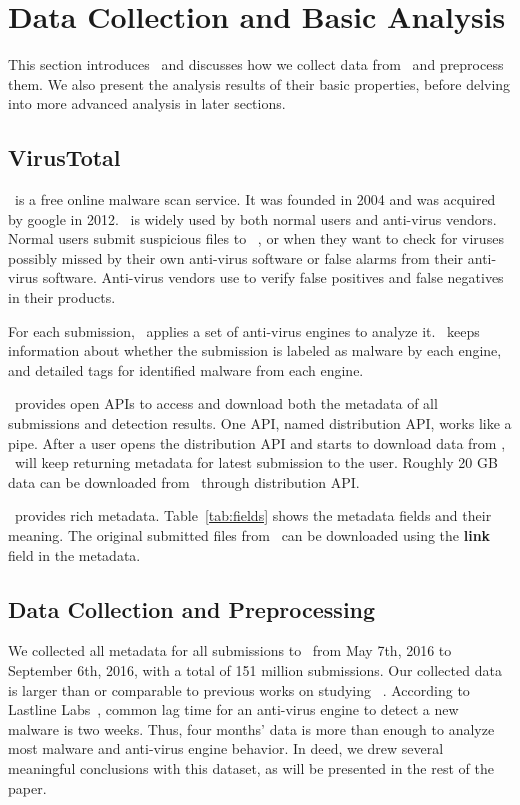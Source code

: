 \section{Data Collection and Basic Analysis}
\label{sec:meth}

This section introduces \vt\ and 
discusses how we collect data from \vt\ and preprocess them.
We also present the analysis results of their basic properties, 
before delving into more advanced analysis in later sections.


\subsection{VirusTotal}
\vt\ is a free online malware scan service.
It was founded in 2004 and was acquired by google in 2012. 
\vt\ is widely used by both normal users and anti-virus vendors.
Normal users submit suspicious files to \vt\ , 
or when they want to check for viruses possibly missed by their own anti-virus software or false alarms from their anti-virus software.  
Anti-virus vendors use \vt to verify false positives and false negatives in their products.

For each submission, \vt\ applies a set of anti-virus engines to analyze it. 
\vt\ keeps information about whether the submission is labeled as malware by each engine, 
and detailed tags for identified malware from each engine. 

\vt\ provides open APIs to access and download both the metadata of all submissions and detection results.
One API, named distribution API, works like a pipe.
After a user opens the distribution API and starts to download data from \vt, 
\vt\ will keep returning metadata for latest submission to the user. 
Roughly 20 GB data can be downloaded from \vt\ through distribution API.  

\vt\ provides rich metadata.
Table~\ref{tab:fields} shows the metadata fields and their meaning.  
The original submitted files from \vt\ can be downloaded using the {\bf link} field in the metadata.

\subsection{Data Collection and Preprocessing}
We collected all metadata for all submissions to \vt\ from May 7th, 2016 to September 6th, 2016,
with a total of 151 million submissions. 
Our collected data is larger than or comparable to previous works on studying \vt~\cite{SongAPsys2016,huangvt2016bigdata}.
According to Lastline Labs~\cite{Lastline}, common lag time for an anti-virus engine to detect a new malware is two weeks.
Thus, four months' data is more than enough to analyze most malware and anti-virus engine behavior. 
In deed, we drew several meaningful conclusions with this dataset, as will be presented in the rest of the paper.

